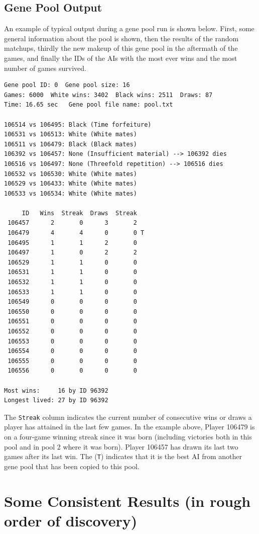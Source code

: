 \documentclass[letterpaper]{article}
\renewcommand{\_}{\allowbreak\textunderscore\allowbreak}
\begin{document}
\subsection{Gene Pool Output}
An example of typical output during a gene pool run is shown below. First, some general information about the pool is shown, then the results of the random matchups, thirdly the new makeup of this gene pool in the aftermath of the games, and finally the IDs of the AIs with the most ever wins and the most number of games survived.
\begin{verbatim}
Gene pool ID: 0  Gene pool size: 16
Games: 6000  White wins: 3402  Black wins: 2511  Draws: 87
Time: 16.65 sec   Gene pool file name: pool.txt

106514 vs 106495: Black (Time forfeiture)
106531 vs 106513: White (White mates)
106511 vs 106479: Black (Black mates)
106392 vs 106457: None (Insufficient material) --> 106392 dies
106516 vs 106497: None (Threefold repetition) --> 106516 dies
106532 vs 106530: White (White mates)
106529 vs 106433: White (White mates)
106533 vs 106534: White (White mates)

     ID   Wins  Streak  Draws  Streak
 106457      2       0      3       2
 106479      4       4      0       0 T
 106495      1       1      2       0
 106497      1       0      2       2
 106529      1       1      0       0
 106531      1       1      0       0
 106532      1       1      0       0
 106533      1       1      0       0
 106549      0       0      0       0
 106550      0       0      0       0
 106551      0       0      0       0
 106552      0       0      0       0
 106553      0       0      0       0
 106554      0       0      0       0
 106555      0       0      0       0
 106556      0       0      0       0

Most wins:     16 by ID 96392
Longest lived: 27 by ID 96392

\end{verbatim}
The \verb|Streak| column indicates the current number of consecutive wins or draws a player has attained in the last few games. In the example above, Player 106479 is on a four-game winning streak since it was born (including victories both in this pool and in pool 2 where it was born). Player 106457 has drawn its last two games after its last win. The (\verb|T|) indicates that it is the best AI from another gene pool that has been copied to this pool.


\section{Some Consistent Results (in rough order of discovery)}
\end{document}

